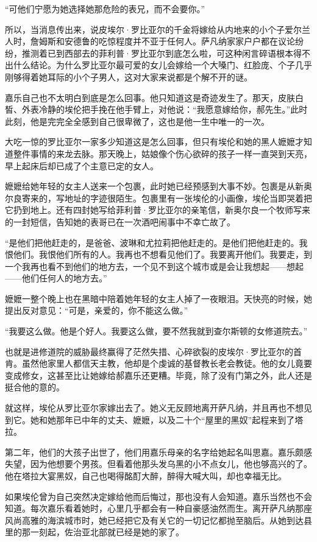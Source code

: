 \par “可他们宁愿为她选择她那危险的表兄，而不会要你。”
\par 所以，当消息传出来，说皮埃尔·罗比亚尔的千金将嫁给从内地来的小个子爱尔兰人时，詹姆斯和安德鲁的吃惊程度并不亚于任何人。萨凡纳家家户户都在议论纷纷，推测着已到西部去的菲利普·罗比亚尔到底怎么啦，可这种闲言碎语根本得不出什么结论。为什么罗比亚尔最可爱的女儿会嫁给一个大嗓门、红脸庞、个子几乎刚够得着她耳际的小个子男人，这对大家来说都是个解不开的谜。
\par 嘉乐自己也不太明白到底是怎么回事。他只知道这是奇迹发生了。那天，皮肤白皙、外表冷静的埃伦把手挽在他手臂上，对他说：“我愿意嫁给你，郝先生。”此时此刻，他是完完全全感到自己很卑微了，这也是他一生中唯一的一次。
\par 大吃一惊的罗比亚尔一家多少知道这是怎么回事，但只有埃伦和她的黑人嬷嬷才知道整件事情的来龙去脉。那天晚上，姑娘像个伤心欲碎的孩子一样一直哭到天亮，早上起床后却已成了个主意已定的女人。
\par 嬷嬷给她年轻的女主人送来一个包裹，此时她已经预感到大事不妙。包裹是从新奥尔良寄来的，写地址的字迹很陌生。包裹里有一张埃伦的小画像，埃伦当即哭着把它扔到地上。还有四封她写给菲利普·罗比亚尔的亲笔信，新奥尔良一个牧师写来的一封短信，告知她的表哥已在一次酒吧闹事中不幸亡故了。
\par “是他们把他赶走的，是爸爸、波琳和尤拉莉把他赶走的。是他们把他赶走的。我恨他们。我恨他们所有的人。我再也不想看见他们了。我要离开他们。我要走，到一个我再也看不到他们的地方去，一个见不到这个城市或是会让我想起——想起——他们任何人的地方去。”
\par 嬷嬷一整个晚上也在黑暗中陪着她年轻的女主人掉了一夜眼泪。天快亮的时候，她提出反对意见：“可是，亲爱的，你不能这么做。”
\par “我要这么做。他是个好人。我要这么做，要不然我就到查尔斯顿的女修道院去。”
\par 也就是进修道院的威胁最终赢得了茫然失措、心碎欲裂的皮埃尔·罗比亚尔的首肯。虽然他家里人都信天主教，他却是个虔诚的基督教长老会教徒。他的女儿竟要变成修女，这甚至比让她嫁给郝嘉乐还更糟。毕竟，除了没有门第之外，此人还是挺合他的意的。
\par 就这样，埃伦从罗比亚尔家嫁出去了。她义无反顾地离开萨凡纳，并且再也不想见到它。她和她那年已中年的丈夫、嬷嬷，以及二十个“屋里的黑奴”起程来到了塔拉。
\par 第二年，他们的大孩子出世了，他们用嘉乐母亲的名字给她起名叫思嘉。嘉乐颇感失望，因为他想要个男孩。但看着他那头发乌黑的小不点女儿，他也够高兴的了。他在塔拉大宴黑奴，自己也喝得酩酊大醉，醉得大喊大叫，却也幸福无比。
\par 如果埃伦曾为自己突然决定嫁给他而后悔过，那也没有人会知道。嘉乐当然也不会知道。每次嘉乐看着她时，心里几乎都会有一种自豪感油然而生。离开萨凡纳那座风尚高雅的海滨城市时，她已经把它及有关它的一切记忆都抛至脑后。从她到达县里的那一刻起，佐治亚北部就已经是她的家了。
